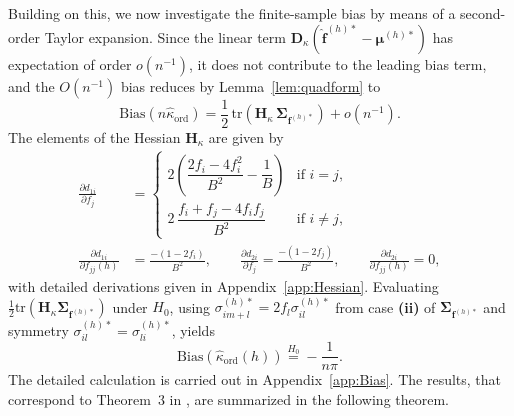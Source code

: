 ﻿\documentclass[12pt,a4paper]{scrreprt}
\theoremstyle{definition}
\begin{document}
Building on this, we now investigate the finite-sample bias by means 
of a second-order Taylor expansion. Since the linear term 
$\boldsymbol{D}_\kappa(\hat{\boldsymbol{f}}^{(h)*} - 
\boldsymbol{\mu}^{(h)*})$ has expectation of order $o(n^{-1})$, 
it does not contribute to the leading bias term, and the $O(n^{-1})$ 
bias reduces by Lemma~\ref{lem:quadform} to
\[
    \mathrm{Bias}(n\hat{\kappa}_{\mathrm{ord}})
    = \frac{1}{2}\,\mathrm{tr}\!\left(
      \boldsymbol{H}_{\kappa}\,\boldsymbol{\Sigma}_{\boldsymbol{f}^{(h)*}}
      \right) + o(n^{-1}).
\]
The elements of the Hessian $\boldsymbol{H}_{\kappa}$ are given by
\begin{align*}
    \frac{\partial d_{1i}}{\partial f_j} 
    &= \begin{cases}
        2\!\left(\dfrac{2f_i-4f_i^2}{B^2} - \dfrac{1}{B}\right) 
        & \text{if } i = j, \\[1ex]
        2\,\dfrac{f_i+f_j-4f_if_j}{B^2} & \text{if } i\neq j,
    \end{cases} \\[1ex]
    \frac{\partial d_{1i}}{\partial f_{jj}(h)} 
    &= \frac{-(1-2f_i)}{B^2}, \qquad
    \frac{\partial d_{2i}}{\partial f_j} 
    = \frac{-(1-2f_j)}{B^2}, \qquad
    \frac{\partial d_{2i}}{\partial f_{jj}(h)} = 0,
\end{align*}
with detailed derivations given in Appendix~\ref{app:Hessian}.
Evaluating $\frac{1}{2}\mathrm{tr}(\boldsymbol{H}_\kappa 
\boldsymbol{\Sigma}_{\boldsymbol{f}^{(h)*}})$ under $H_0$, using 
$\sigma^{(h)*}_{im+l} = 2f_l\sigma^{(h)*}_{il}$ from case 
\textbf{(ii)} of $\boldsymbol{\Sigma}_{\boldsymbol{f}^{(h)*}}$ and 
symmetry $\sigma^{(h)*}_{il} = \sigma^{(h)*}_{li}$, yields
\[
    \mathrm{Bias}(\hat{\kappa}_{\mathrm{ord}}(h)) 
    \overset{H_0}{=} -\frac{1}{n\pi}.
\]
The detailed calculation is carried out in Appendix~\ref{app:Bias}.
The results, that correspond to Theorem~3 in \citet{weiss2021categorical}, are summarized in the following theorem.
\end{document}
